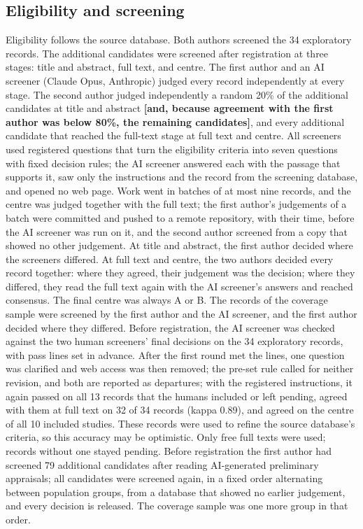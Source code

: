 \documentclass[11pt]{article}
\newcommand{\tbd}[1]{\textbf{[#1]}}
\begin{document}
\subsection{Eligibility and screening}
Eligibility follows the source database. Both authors screened the 34 exploratory records. The additional candidates
were screened after registration at three stages: title and abstract, full text, and centre. The first author and an
AI screener (Claude Opus, Anthropic) judged every record independently at every stage. The second author judged
independently a random 20\% of the additional candidates at title and abstract \tbd{and, because agreement with the
first author was below 80\%, the remaining candidates}, and every additional candidate that reached the full-text
stage at full text and centre. All screeners used registered questions that turn the eligibility criteria into seven
questions with fixed decision rules; the AI screener answered each with the passage that supports it, saw only the
instructions and the record from the screening database, and opened no web page. Work went in batches of at most nine
records, and the centre was judged together with the full text; the first author's judgements of a batch were
committed and pushed to a remote repository, with their time, before the AI screener was run on it, and the second
author screened from a copy that showed no other judgement. At title and abstract, the first author decided where the
screeners differed. At full text and centre, the two authors decided every record together: where they agreed, their
judgement was the decision; where they differed, they read the full text again with the AI screener's answers and
reached consensus. The final centre was always A or B. The records of the coverage sample were screened by the first
author and the AI screener, and the first author decided where they differed. Before registration, the AI screener was
checked against the two human screeners' final decisions on the 34 exploratory records, with pass lines set in
advance. After the first round met the lines, one question was clarified and web access was then removed; the pre-set
rule called for neither revision, and both are reported as departures; with the registered instructions, it again
passed on all 13 records that the humans included or left pending, agreed with them at full text on 32 of 34 records
(kappa 0.89), and agreed on the centre of all 10 included studies. These records were used to refine the source
database's criteria, so this accuracy may be optimistic. Only free full texts were used; records without one stayed
pending. Before registration the first author had screened 79 additional candidates after reading AI-generated
preliminary appraisals; all candidates were screened again, in a fixed order alternating between population groups,
from a database that showed no earlier judgement, and every decision is released. The coverage sample was one more
group in that order.
\end{document}
